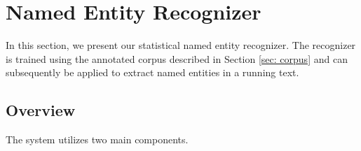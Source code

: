 \documentclass[11pt]{article}
\begin{document}




\section{Named Entity Recognizer}
\label{sec: named entity recognizer}

In this section, we present our statistical named entity recognizer. The recognizer is trained using the annotated corpus described in Section \ref{sec: corpus} and can subsequently be applied to extract named entities in a running text. 

\subsection{Overview}

The system utilizes two main components.
\end{document}
